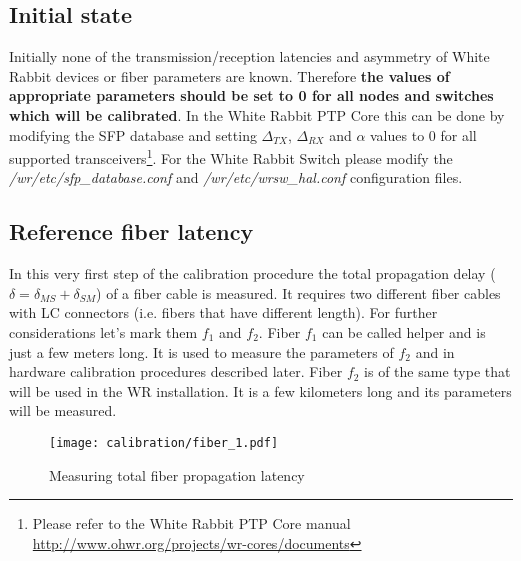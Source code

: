 \subsection{Initial state}
Initially none of the transmission/reception latencies and asymmetry of White 
Rabbit devices or fiber parameters are known. Therefore {\bf the values of 
appropriate parameters should be set to 0 for all nodes and switches which will
be calibrated}. In the White Rabbit PTP Core this can be done by modifying the SFP
database and setting $\Delta_{TX}$, $\Delta_{RX}$ and $\alpha$ values to 0 for all
supported transceivers\footnote{Please refer to the White Rabbit PTP Core manual
\url{http://www.ohwr.org/projects/wr-cores/documents}}. For the White Rabbit Switch 
please modify the \emph{/wr/etc/sfp\_database.conf} and
\emph{/wr/etc/wrsw\_hal.conf} configuration files.

\subsection{Reference fiber latency}
\label{subsec:refiber}

In this very first step of the calibration procedure the total propagation delay
($\delta = \delta_{MS} + \delta_{SM}$) of a fiber cable is measured. It requires
two different fiber cables with LC connectors (i.e. fibers that have
different length). For further considerations let's mark them $f_1$ and $f_2$.
Fiber $f_1$ can be called helper and is just a few meters long. It is used to
measure the parameters of $f_2$ and in hardware calibration procedures described
later. Fiber $f_2$ is of the same type that will be used in the WR installation.
It is a few kilometers long and its parameters will be measured.

\begin{figure}[ht]
	\begin{center}
		\texttt{[image: calibration/fiber\_1.pdf]}
		\caption{Measuring total fiber propagation latency}
		\label{fig:refiber:latency}
	\end{center}
\end{figure}

